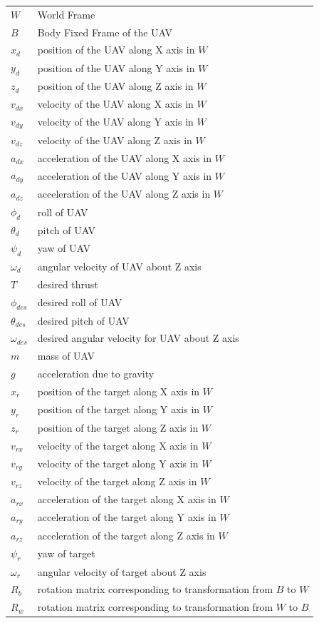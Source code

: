\documentclass[conf]{new-aiaa}
\begin{document}
{\renewcommand\arraystretch{1.0}
\noindent\begin{longtable*}{@{}l @{\quad=\quad} l@{}}
$W$ & World Frame\\
$B$ & Body Fixed Frame of the UAV\\
$x_{d}$ & position of the UAV along X axis in $W$\\
$y_{d}$ & position of the UAV along Y axis in $W$\\
$z_{d}$ & position of the UAV along Z axis in $W$\\
$v_{dx}$ & velocity of the UAV along X axis in $W$\\
$v_{dy}$ & velocity of the UAV along Y axis in $W$\\
$v_{dz}$ & velocity of the UAV along Z axis in $W$\\
$a_{dx}$ & acceleration of the UAV along X axis in $W$\\
$a_{dy}$ & acceleration of the UAV along Y axis in $W$\\
$a_{dz}$ & acceleration of the UAV along Z axis in $W$\\
$\phi_{d}$ & roll of UAV\\
$\theta_{d}$ & pitch of UAV\\
$\psi_{d}$ & yaw of UAV\\
$\omega_{d}$ & angular velocity of UAV about Z axis\\
$T$ & desired thrust\\
$\phi_{des}$ & desired roll of UAV\\
$\theta_{des}$ & desired pitch of UAV\\
$\omega_{des}$ & desired angular velocity for UAV about Z axis\\
$m$ & mass of UAV\\
$g$ & acceleration due to gravity\\
$x_{r}$ & position of the target along X axis in $W$\\
$y_{r}$ & position of the target along Y axis in $W$\\
$z_{r}$ & position of the target along Z axis in $W$\\
$v_{rx}$ & velocity of the target along X axis in $W$\\
$v_{ry}$ & velocity of the target along Y axis in $W$\\
$v_{rz}$ & velocity of the target along Z axis in $W$\\
$a_{rx}$ & acceleration of the target along X axis in $W$\\
$a_{ry}$ & acceleration of the target along Y axis in $W$\\
$a_{rz}$ & acceleration of the target along Z axis in $W$\\
$\psi_{r}$ & yaw of target\\
$\omega_{r}$ & angular velocity of target about Z axis\\
$R_{b}$ & rotation matrix corresponding to transformation from $B$ to $W$\\
$R_{w}$ & rotation matrix corresponding to transformation from $W$ to $B$\\

\end{longtable*}}
\end{document}
